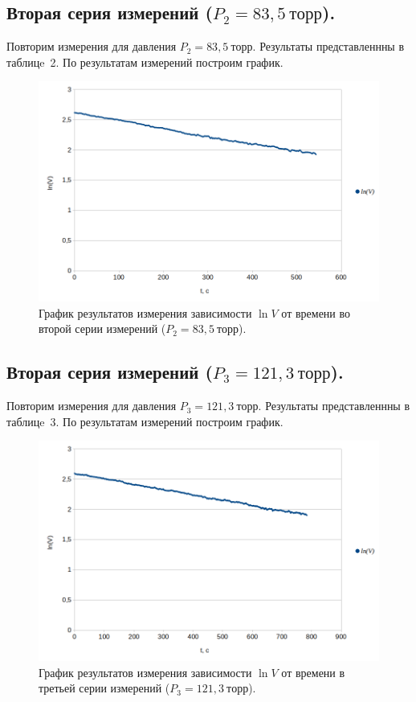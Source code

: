 \documentclass[a4paper,11pt]{article}
\begin{document}
\subsection{Вторая серия измерений ($P_{2} = 83,5\ торр$).}
Повторим измерения для давления $P_{2} = 83,5\ торр$. Результаты представленнны в таблицe~2.
По результатам измерений построим график.
\begin{figure}[h!]\label{fig:img4}
  \centering
  \includegraphics[scale = 0.4125]{graph2.png}
  \caption{График результатов измерения зависимости $\ln V$ от времени во второй серии измерений ($P_{2} = 83,5\ торр$).}
\end{figure}
\subsection{Вторая серия измерений ($P_{3} = 121,3\ торр$).}
Повторим измерения для давления $P_{3} = 121,3\ торр$. Результаты представленнны в таблицe~3.
По результатам измерений построим график.
\begin{figure}[h!]\label{fig:img4}
  \centering
  \includegraphics[scale = 0.4125]{graph3.png}
  \caption{График результатов измерения зависимости $\ln V$ от времени в третьей серии измерений ($P_{3} = 121,3\ торр$).}
\end{figure}
\end{document}
